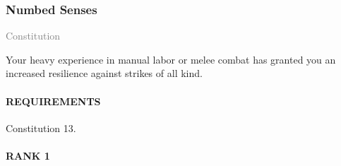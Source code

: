 


\subsubsection{Numbed Senses} \label{feat::numbedsenses}
\small{\textcolor{gray}{Constitution}}

\normalsize
Your heavy experience in manual labor or melee combat has granted you an increased resilience against strikes of all kind.
\paragraph{REQUIREMENTS} Constitution 13.
\paragraph{RANK 1}
